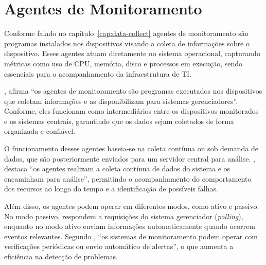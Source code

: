 \documentclass[
    12pt
    ,oneside
    ,a4paper
    ,chapter=TITLE
    ,section=TITLE
    ,sumario=abnt-6027-2012]{abntex2}
\begin{document}

\chapter{Agentes de Monitoramento}
\label{cap:agents}

Conforme falado no capítulo~\ref{cap:data-collect} agentes de monitoramento são programas instalados nos dispositivos visando a coleta de informações sobre o dispositivo. Esses agentes atuam diretamente no sistema operacional, capturando métricas como uso de CPU, memória, disco e processos em execução, sendo essenciais para o acompanhamento da infraestrutura de TI.

, afirma “os agentes de monitoramento são programas executados nos dispositivos que coletam informações e as disponibilizam para sistemas gerenciadores”. Conforme, eles funcionam como intermediários entre os dispositivos monitorados e os sistemas centrais, garantindo que os dados sejam coletados de forma organizada e confiável.

O funcionamento desses agentes baseia-se na coleta contínua ou sob demanda de dados, que são posteriormente enviados para um servidor central para análise. , destaca “os agentes realizam a coleta contínua de dados do sistema e os encaminham para análise”, permitindo o acompanhamento do comportamento dos recursos ao longo do tempo e a identificação de possíveis falhas.

Além disso, os agentes podem operar em diferentes modos, como ativo e passivo. No modo passivo, respondem a requisições do sistema gerenciador (\textit{polling}), enquanto no modo ativo enviam informações automaticamente quando ocorrem eventos relevantes. Segundo , “os sistemas de monitoramento podem operar com verificações periódicas ou envio automático de alertas”, o que aumenta a eficiência na detecção de problemas.
\end{document}
